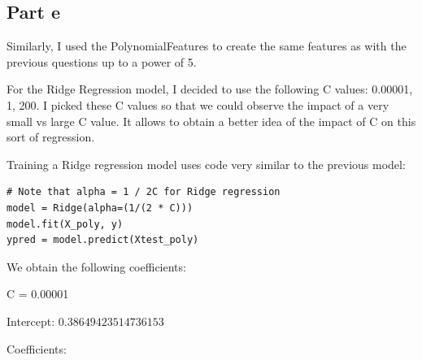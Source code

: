 \documentclass[10pt]{article}
\begin{document}
\subsection*{Part e}
Similarly, I used the PolynomialFeatures to create the same features as with the previous questions up
to a power of 5.

For the Ridge Regression model, I decided to use the following C values: 0.00001, 1, 200.
I picked these C values so that we could observe the impact of a very small vs large C value.
It allows to obtain a better idea of the impact of C on this sort of regression.

Training a Ridge regression model uses code very similar to 
the previous model:

\begin{lstlisting}
# Note that alpha = 1 / 2C for Ridge regression
model = Ridge(alpha=(1/(2 * C)))
model.fit(X_poly, y)
ypred = model.predict(Xtest_poly)
\end{lstlisting}
\vspace{5mm} %
We obtain the following coefficients:

C = 0.00001
\par
Intercept: $0.38649423514736153$
\par
Coefficients:
\begin{equation*}
    [ 0.00000000e+00, 1.51458548e-04, 1.47029680e-03, 3.40428762e-04
\end{equation*}
\begin{equation*}
    -4.46143189e-05, -9.72722585e-06, 6.50007693e-05, 5.18327561e-04
\end{equation*}
\begin{equation*}
    1.43993794e-04, 9.12639486e-04, 3.19489175e-04, -2.50299601e-05
\end{equation*}
\begin{equation*}
    9.40108739e-05, -2.14996644e-05, -1.26054105e-05, 3.83327579e-05
\end{equation*}
\begin{equation*}
    3.23922402e-04, 6.38460692e-05, 3.09930239e-04, 1.35033294e-04
\end{equation*}
\begin{equation*}
    6.60283127e-04]
\end{equation*}

\vspace{5mm} %
\end{document}
